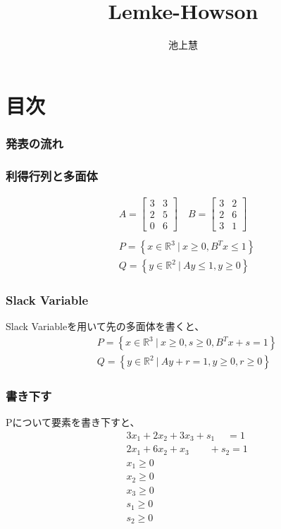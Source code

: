\documentclass[dvipdfmx, 12pt]{beamer}
\title{Lemke-Howson}
\author{池上慧}
\begin{document}
\frame{\maketitle}

\section*{目次}
\begin{frame} \frametitle{発表の流れ}
\tableofcontents
\end{frame}

\begin{frame}\frametitle{利得行列と多面体}
\begin{align*}
	A = 
	\begin{bmatrix} 
	3 & 3\\
	2 & 5 \\
	0 & 6
	\end{bmatrix}\quad
	B = 
	\begin{bmatrix}
	3 & 2\\
	2 & 6\\
	3 & 1
	\end{bmatrix}\\
\end{align*}
\begin{align*}
	&P = \left\{ x \in \mathbb{R}^3\ |\ x \geq 0, B^{T}x \leq 1 \right\}\\
	&Q = \left\{ y \in \mathbb{R}^2\ |\ Ay \leq 1, y\geq 0 \right\}
\end{align*}

\end{frame}

\begin{frame}\frametitle{Slack Variable}
Slack Variableを用いて先の多面体を書くと、
\begin{align*}
	&P = \left\{ x \in \mathbb{R}^3\ |\ x \geq 0, s \geq 0, B^{T}x + s= 1 \right\}\\
	&Q = \left\{ y \in \mathbb{R}^2\ |\ Ay + r = 1, y\geq 0, r \geq 0 \right\}
\end{align*}
\end{frame}

\begin{frame}\frametitle{書き下す}
Pについて要素を書き下すと、
\begin{align*}
	&3x_1 + 2x_2 + 3x_3 + s_1 \quad \ = 1\\
	&2x_1 + 6x_2 + x_3 \quad \quad +s_2 = 1\\
	&x_1 \geq 0\\
	&x_2 \geq 0\\
	&x_3 \geq 0\\
	&s_1 \geq 0\\
	&s_2 \geq 0
\end{align*}
\end{frame}
\end{document}
